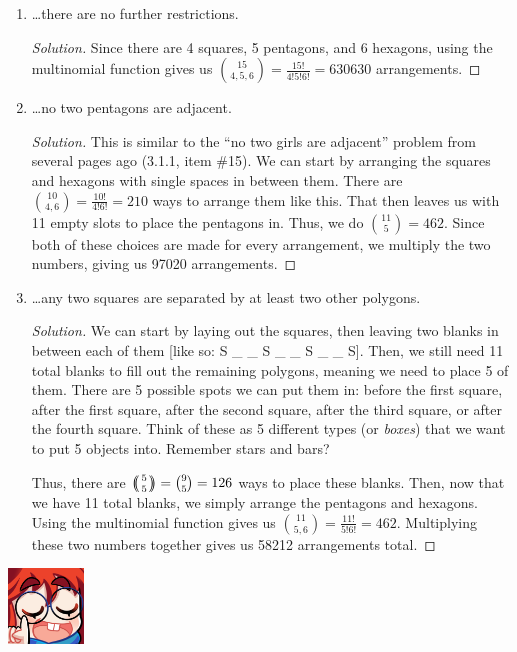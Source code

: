 \documentclass{article}
\newcommand{\multibinom}[2]{
  \left(\!\!\middle(\genfrac{}{}{0pt}{}{#1}{#2}\middle)\!\!\right)} %
\newenvironment{solution}
  {\renewcommand\qedsymbol{$\blacksquare$}\begin{proof}[Solution]}
  {\end{proof}}
\begin{document}
\begin{enumerate}
\begin{enumerate}
        \item \ldots there are no further restrictions.\begin{solution} 
            Since there are 4 squares, 5 pentagons, and 6 hexagons, using the multinomial function gives us $\binom{15}{4,5,6} = \frac{15!}{4!5!6!} =  630630$ arrangements.     
        \end{solution} 
        \item \ldots no two pentagons are adjacent.\begin{solution} 
            This is similar to the ``no two girls are adjacent'' problem from several pages ago (3.1.1, item \#15). We can start by arranging the 
            squares and hexagons with single spaces in between them. There are $\binom{10}{4,6} = \frac{10!}{4!6!} = 210$ ways to arrange them like this. That then leaves us with 
            11 empty slots to place the pentagons in. Thus, we do $\binom{11}{5} = 462$. Since both of these choices are made for every arrangement, we multiply the two numbers, giving us 97020 arrangements.
        \end{solution}
        \item \ldots any two squares are separated by at least two other polygons.\begin{solution} 
            We can start by laying out the squares, then leaving two blanks in between each of them [like so: S \_ \_ S \_ \_ S \_ \_ S]. Then, we still need 11 total blanks 
            to fill out the remaining polygons, meaning we need to place 5 of them. There are 5 possible spots we can put them in: before the first square, after the first square, 
            after the second square, after the third square, or after the fourth square. Think of these as 5 different types (or \textit{boxes}) that we want to put 5 objects into. Remember stars and bars?\par  
            Thus, there are $\multibinom{5}{5} = \binom{9}{5} = 126$ ways to place these blanks. Then, now that we have 11 total blanks, we simply arrange the pentagons and hexagons. Using the multinomial function 
            gives us $\binom{11}{5,6} = \frac{11!}{5!6!} = 462$. Multiplying these two numbers together gives us 58212 arrangements total. 
        \end{solution} 
    \end{enumerate} 
    \begin{minipage}[t]{.14\textwidth}
        \vspace{0pt}
        \includegraphics[width=2cm]{nerd_maddy.png} 

\end{minipage}
\end{enumerate}
\end{document}
